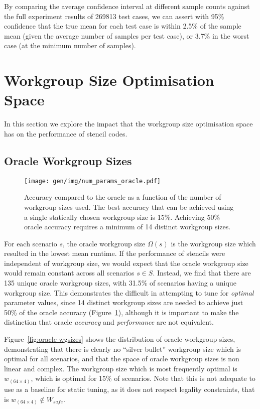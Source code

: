 By comparing the average confidence interval at different sample
counts against the full experiment results of 269813 test cases, we
can assert with 95\% confidence that the true mean for each test case
is within 2.5\% of the sample mean (given the average number of
samples per test case), or 3.7\% in the worst case (at the minimum
number of samples). 


\section{Workgroup Size Optimisation Space}

In this section we explore the impact that the workgroup size
optimisation space has on the performance of stencil codes.

\subsection{Oracle Workgroup Sizes}

\begin{figure}
\centering
\texttt{[image: gen/img/num\_params\_oracle.pdf]}
\caption[Oracle accuracy vs.\ number of workgroup sizes]{%
  Accuracy compared to the oracle as a function of the number of
  workgroup sizes used. The best accuracy that can be achieved using a
  single statically chosen workgroup size is 15\%. Achieving 50\%
  oracle accuracy requires a minimum of 14 distinct workgroup sizes.%
}
\label{fig:oracle-accuracy}
\end{figure}

For each scenario $s$, the oracle workgroup size $\Omega(s)$ is the
workgroup size which resulted in the lowest mean runtime. If the
performance of stencils were independent of workgroup size, we would
expect that the oracle workgroup size would remain constant across all
scenarios $s \in S$. Instead, we find that there are 135 unique oracle
workgroup sizes, with 31.5\% of scenarios having a unique workgroup
size. This demonstrates the difficult in attempting to tune for
\emph{optimal} parameter values, since 14 distinct workgroup sizes are
needed to achieve just 50\% of the oracle accuracy
(Figure~\ref{fig:oracle-accuracy}), although it is important to make
the distinction that oracle \emph{accuracy} and \emph{performance} are
not equivalent.

Figure~\ref{fig:oracle-wgsizes} shows the distribution of oracle
workgroup sizes, demonstrating that there is clearly no ``silver
bullet'' workgroup size which is optimal for all scenarios, and that
the space of oracle workgroup sizes is non linear and complex. The
workgroup size which is most frequently optimal is
$w_{(64 \times 4)}$, which is optimal for 15\% of scenarios. Note that
this is not adequate to use as a baseline for static tuning, as it
does not respect legality constraints, that is
$w_{(64 \times 4)} \not\in W_{safe}$.


